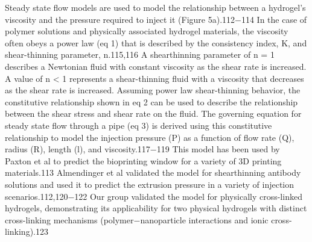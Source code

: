 \documentclass[../../main-notes.tex]{subfiles}
\begin{document}
Steady state flow models are used to model the relationship between a hydrogel’s viscosity and the pressure required to  inject it (Figure 5a).112−114  
In the case of polymer solutions and physically associated hydrogel materials, the viscosity often obeys a power law (eq 1) that is described by the consistency  index, K, and shear-thinning parameter, n.115,116 
A shearthinning parameter of n = 1 describes a Newtonian fluid with constant viscosity as the shear rate is increased. 
A value of n < 1 represents a shear-thinning fluid with a viscosity that decreases as the shear rate is increased. 
Assuming power law shear-thinning behavior, the constitutive relationship shown in eq 2 can be used to describe the relationship between the shear stress and shear rate on the fluid. 
The governing equation for steady state flow through a pipe (eq 3) is derived using this constitutive relationship to model the injection pressure (P) as a function of flow rate (Q), radius (R), length (l), and  viscosity.117−119 
This model has been used by Paxton et al to predict the bioprinting window for a variety of 3D printing  materials.113 Almendinger et al validated the model for shearthinning antibody solutions and used it to predict the extrusion  pressure in a variety of injection scenarios.112,120−122 
Our group validated the model for physically cross-linked hydrogels, demonstrating its applicability for two physical hydrogels with distinct cross-linking mechanisms (polymer−nanoparticle  interactions and ionic cross-linking).123
\end{document}
